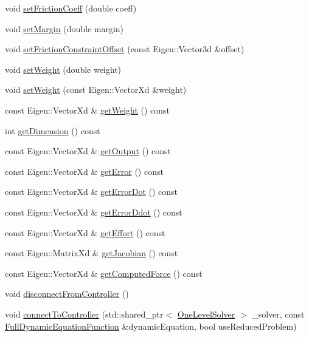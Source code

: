 \begin{DoxyCompactItemize}
\item 
void \hyperlink{classocra_1_1Task_ae37c47d2481ebfa034dc79cbf149776a}{set\+Friction\+Coeff} (double coeff)
\item 
void \hyperlink{classocra_1_1Task_a62b7814143aa571cc668fef9bdea6815}{set\+Margin} (double margin)
\item 
void \hyperlink{classocra_1_1Task_ac3738872a446ffc6361d096659ae2ba6}{set\+Friction\+Constraint\+Offset} (const Eigen\+::\+Vector3d \&offset)
\item 
void \hyperlink{classocra_1_1Task_a857ee8b756c78d5a90cdc78ae6eb855e}{set\+Weight} (double weight)
\item 
void \hyperlink{classocra_1_1Task_a81589c3855f9f39526d9d4ceda6fe95e}{set\+Weight} (const Eigen\+::\+Vector\+Xd \&weight)
\item 
const Eigen\+::\+Vector\+Xd \& \hyperlink{classocra_1_1Task_a44b62b6cf152c446f26bd1826ce151a2}{get\+Weight} () const 
\item 
int \hyperlink{classocra_1_1Task_a649fe2637d75d546631763b08163955b}{get\+Dimension} () const 
\item 
const Eigen\+::\+Vector\+Xd \& \hyperlink{classocra_1_1Task_a17561da8c2922ead7134a464cdbd66e2}{get\+Output} () const 
\item 
const Eigen\+::\+Vector\+Xd \& \hyperlink{classocra_1_1Task_af94d7336d448b9be361aaa1749e79b8c}{get\+Error} () const 
\item 
const Eigen\+::\+Vector\+Xd \& \hyperlink{classocra_1_1Task_a74999658f585f0ad6478324d0de3fc93}{get\+Error\+Dot} () const 
\item 
const Eigen\+::\+Vector\+Xd \& \hyperlink{classocra_1_1Task_aef74c1793ab609475838b25b6c1412d3}{get\+Error\+Ddot} () const 
\item 
const Eigen\+::\+Vector\+Xd \& \hyperlink{classocra_1_1Task_aded43a15c7994e90f4e7622c481bbc47}{get\+Effort} () const 
\item 
const Eigen\+::\+Matrix\+Xd \& \hyperlink{classocra_1_1Task_a8dddfbfa9dee1e06d3ba612a2f0e9305}{get\+Jacobian} () const 
\item 
const Eigen\+::\+Vector\+Xd \& \hyperlink{classocra_1_1Task_a070c3acb112a4d7fc38a77d6d53dd303}{get\+Computed\+Force} () const 
\item 
void \hyperlink{classocra_1_1Task_a3d780dc6817552070f3d5570a9052e3f}{disconnect\+From\+Controller} ()
\item 
void \hyperlink{classocra_1_1Task_a38f7a4e8bcf2bd502c606f2b536b6f52}{connect\+To\+Controller} (std\+::shared\+\_\+ptr$<$ \hyperlink{classocra_1_1OneLevelSolver}{One\+Level\+Solver} $>$ \+\_\+solver, const \hyperlink{classocra_1_1FullDynamicEquationFunction}{Full\+Dynamic\+Equation\+Function} \&dynamic\+Equation, bool use\+Reduced\+Problem)
\end{DoxyCompactItemize}
